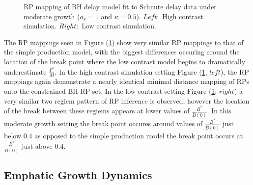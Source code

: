 \begin{figure}[h!]
\begin{minipage}[h!]{0.09\textwidth}
\end{minipage}
\caption{
RP mapping of BH delay model fit to Schnute delay data under moderate growth ($a_s=1$ and $\kappa=0.5$).
$Left:$ High contrast simulation.
$Right:$ Low contrast simulation.
}\label{moderateGrowth}
\end{figure}

%
The RP mappings seen in Figure (\ref{moderateGrowth}) show very similar RP mappings
to that of the simple production model, with the biggest differences occuring
around the location of the break point where the low contrast model begins to
dramatically underestimate $\frac{F^*}{M}$.
%
In the high contrast simulation setting Figure (\ref{moderateGrowth}; $left$),
the RP mappings again demonstrate a nearly identical minimal distance mapping of
RPs onto the constrained BH RP set. In the low contrast setting Figure (\ref{moderateGrowth}; $right$)
a very similar two regiem pattern of RP inference is observed, however the
location of the break between these regiems appears at lower values of
$\frac{B^*}{\bar B(0)}$. In this moderate growth setting the break point
occures around values of $\frac{B^*}{\bar B(0)}$ just below 0.4 as opposed to 
the simple production model the break point occurs at $\frac{B^*}{\bar B(0)}$
just above 0.4.


\subsection{Emphatic Growth Dynamics}

